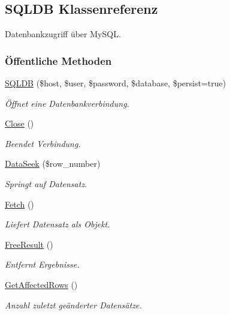 \hypertarget{classSQLDB}{
\subsection{SQLDB Klassenreferenz}
\label{classSQLDB}
}
Datenbankzugriff über My\-SQL.  


\subsubsection*{\"{O}ffentliche Methoden}
\begin{CompactItemize}
\item 
\hyperlink{classSQLDB_069ba0502ed4bfedb72768a03ff6854d}{SQLDB} (\$host, \$user, \$password, \$database, \$persist=true)
\begin{CompactList}\small\item\em Öffnet eine Datenbankverbindung. \item\end{CompactList}\item 
\hyperlink{classSQLDB_0e82206260d6fc4d0eaec32022125048}{Close} ()
\begin{CompactList}\small\item\em Beendet Verbindung. \item\end{CompactList}\item 
\hyperlink{classSQLDB_0766b746a81684e014c235db35818e54}{Data\-Seek} (\$row\_\-number)
\begin{CompactList}\small\item\em Springt auf Datensatz. \item\end{CompactList}\item 
\hyperlink{classSQLDB_a55c00ce1de0e50e0a58cae61892ba35}{Fetch} ()
\begin{CompactList}\small\item\em Liefert Datensatz als Objekt. \item\end{CompactList}\item 
\hyperlink{classSQLDB_e7da8a2f993c4bb91167a150e07e8b52}{Free\-Result} ()
\begin{CompactList}\small\item\em Entfernt Ergebnisse. \item\end{CompactList}\item 
\hyperlink{classSQLDB_8f3c28ae4ed5941c043459d6204a887b}{Get\-Affected\-Rows} ()
\begin{CompactList}\small\item\em Anzahl zuletzt geänderter Datensätze. \item\end{CompactList}\item 

\end{CompactItemize}
